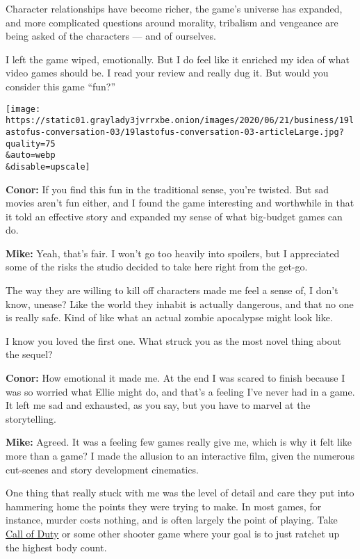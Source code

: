 Character relationships have become richer, the game's universe has
expanded, and more complicated questions around morality, tribalism and
vengeance are being asked of the characters --- and of ourselves.

I left the game wiped, emotionally. But I do feel like it enriched my
idea of what video games should be. I read your review and really dug
it. But would you consider this game ``fun?''

\texttt{[image: https://static01.graylady3jvrrxbe.onion/images/2020/06/21/business/19lastofus-conversation-03/19lastofus-conversation-03-articleLarge.jpg?quality=75\\\&auto=webp\\\&disable=upscale]}

\textbf{Conor:} If you find this fun in the traditional sense, you're
twisted. But sad movies aren't fun either, and I found the game
interesting and worthwhile in that it told an effective story and
expanded my sense of what big-budget games can do.

\textbf{Mike:} Yeah, that's fair. I won't go too heavily into spoilers,
but I appreciated some of the risks the studio decided to take here
right from the get-go.

The way they are willing to kill off characters made me feel a sense of,
I don't know, unease? Like the world they inhabit is actually dangerous,
and that no one is really safe. Kind of like what an actual zombie
apocalypse might look like.

I know you loved the first one. What struck you as the most novel thing
about the sequel?

\textbf{Conor:} How emotional it made me. At the end I was scared to
finish because I was so worried what Ellie might do, and that's a
feeling I've never had in a game. It left me sad and exhausted, as you
say, but you have to marvel at the storytelling.

\textbf{Mike:} Agreed. It was a feeling few games really give me, which
is why it felt like more than a game? I made the allusion to an
interactive film, given the numerous cut-scenes and story development
cinematics.

One thing that really stuck with me was the level of detail and care
they put into hammering home the points they were trying to make. In
most games, for instance, murder costs nothing, and is often largely the
point of playing. Take
\href{https://www.nytimes3xbfgragh.onion/2014/11/11/arts/video-games/call-of-duty-advanced-warfare-stars-kevin-spacey.html}{Call
of Duty} or some other shooter game where your goal is to just ratchet
up the highest body count.

